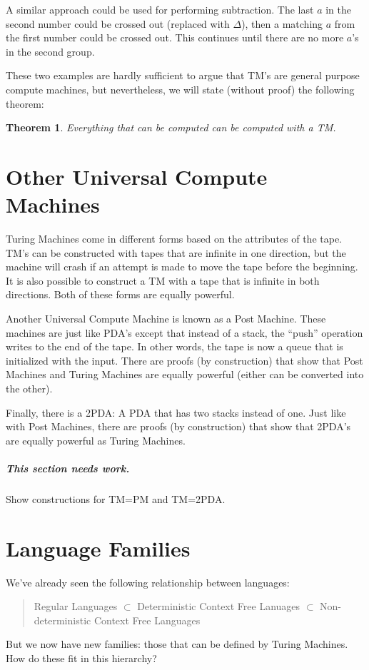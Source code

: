 \documentclass[letterpaper,12pt,openany,reqno]{book}%
\newcommand{\needswork}{\paragraph{This section needs work.}}
\newtheorem{theorem}{Theorem}
\begin{document}
A similar approach could be used for performing subtraction. The last $a$ in the second number could be crossed out (replaced with $\Delta$), then a matching $a$ from the first number could be crossed out. This continues until there are no more $a$'s in the second group.

These two examples are hardly sufficient to argue that TM's are general purpose compute machines, but nevertheless, we will state (without proof) the following theorem:

\begin{theorem}
Everything that can be computed can be computed with a TM.
\end{theorem}

\chapter{Other Universal Compute Machines}
Turing Machines come in different forms based on the attributes of the tape. TM's can be constructed with tapes that are infinite in one direction, but the machine will crash if an attempt is made to move the tape before the beginning. It is also possible to construct a TM with a tape that is infinite in both directions. Both of these forms are equally powerful.

Another Universal Compute Machine is known as a Post Machine. These machines are just like PDA's except that instead of a stack, the ``push'' operation writes to the end of the tape. In other words, the tape is now a queue that is initialized with the input. There are proofs (by construction) that show that Post Machines and Turing Machines are equally powerful (either can be converted into the other).

Finally, there is a 2PDA: A PDA that has two stacks instead of one. Just like with Post Machines, there are proofs (by construction) that show that 2PDA's are equally powerful as Turing Machines.

\needswork Show constructions for TM=PM and TM=2PDA.

\chapter{Language Families}
We've already seen the following relationship between languages:
\begin{quote}
Regular Languages $\subset$ Deterministic Context Free Lanuages $\subset$ Non-deterministic Context Free Languages
\end{quote}
But we now have new families: those that can be defined by Turing Machines. How do these fit in this hierarchy?
\end{document}
